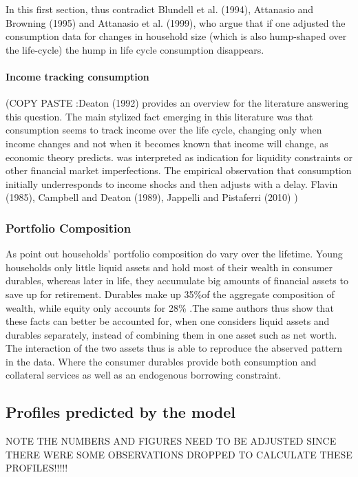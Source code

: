 \documentclass[a4paper,12pt,legno]{article}
\begin{document}
In this first section, \cite{FV&K2011} thus contradict Blundell et al. (1994), Attanasio and Browning (1995) and Attanasio et al. (1999), who argue that if one adjusted the consumption data for changes in household size (which is also hump-shaped over the life-cycle) the hump in life cycle consumption disappears. 

\paragraph{Income tracking consumption}

(COPY PASTE :Deaton (1992) provides an overview for the literature answering this question. The main stylized fact emerging in this literature was that consumption seems to track income over the life cycle, changing only when income changes and not when it becomes known that income will change, as economic theory predicts. was interpreted as indication for liquidity constraints or other financial market imperfections. The empirical observation that consumption initially underresponds to income shocks and then adjusts with a delay. Flavin (1985), Campbell and Deaton (1989), Jappelli and Pistaferri (2010) )

\subsubsection{Portfolio Composition} 
As \cite{FV&K2011} point out households' portfolio composition do vary over the lifetime. Young households only little liquid assets and hold most of their wealth in consumer durables, whereas later in life, they accumulate big amounts of financial assets to save up for retirement. Durables make up 35\%of the aggregate composition of wealth, while equity only accounts for 28\% \citep{FV&K2011}.The same authors thus show that these facts can better be accounted for, when one considers liquid assets and durables separately, instead of combining them in one asset such as net worth. The interaction of the two assets thus is able to reproduce the abserved pattern in the data. Where the consumer durables provide both consumption and collateral services as well as an endogenous borrowing constraint. 

\subsection{Profiles predicted by the model}

NOTE THE NUMBERS AND FIGURES NEED TO BE ADJUSTED SINCE THERE WERE SOME OBSERVATIONS DROPPED TO CALCULATE THESE PROFILES!!!!!
\end{document}
